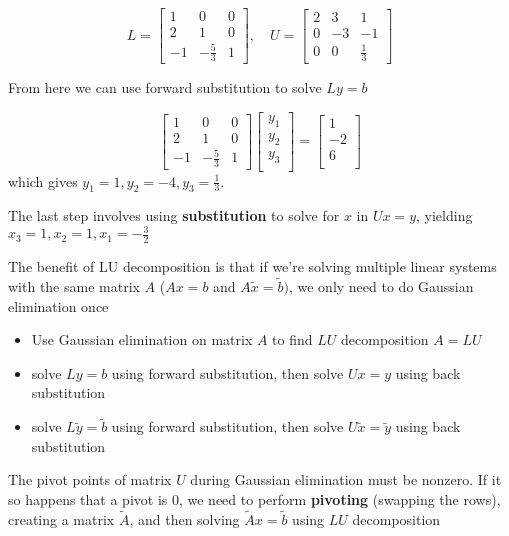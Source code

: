 \documentclass{article}
\begin{document}
\[ L = \begin{bmatrix} 1 & 0 & 0 \\ 2 & 1 & 0 \\ -1 & -\frac{5}{3} & 1 \end{bmatrix}, \quad U = \begin{bmatrix} 2 & 3 & 1 \\ 0 & -3 & -1 \\ 0 & 0 & \frac{1}{3} \end{bmatrix}\]

From here we can use forward substitution to solve $Ly = b$

\[ \left[ \begin{array}{ccc}
    1 & 0 & 0 \\
    2 & 1 & 0 \\
    -1 & -\frac{5}{3} & 1
\end{array} \right]
%
\left[ \begin{array}{c}
    y_1 \\
    y_2 \\
    y_3 \\
\end{array} \right]
 =
\left[ \begin{array}{c}
    1 \\
    -2 \\
    6 \\
\end{array} \right] \]
which gives $y_1 = 1, y_2 = -4, y_3 = \frac{1}{3}$. 

The last step involves using \textbf{substitution} to solve for $x$ in $Ux = y$, yielding $x_3 = 1, x_2 = 1, x_1 = -\frac{3}{2}$

The benefit of LU decomposition is that if we're solving multiple linear systems with the same matrix $A$ ($Ax = b$ and $A\tilde{x} = \tilde{b})$, we only need to do Gaussian elimination once
\begin{itemize}
  \item Use Gaussian elimination on matrix $A$ to find $LU$ decomposition $A= LU$
  \item solve $Ly = b$ using forward substitution, then solve $Ux = y$ using back substitution
  \item solve $L \tilde{y} = \tilde{b}$ using forward substitution, then solve $U\tilde{x} = \tilde{y}$ using back substitution
\end{itemize}

The pivot points of matrix $U$ during Gaussian elimination must be nonzero. If it so happens that a pivot is $0$, we need to perform \textbf{pivoting} (swapping the rows), creating a matrix $\tilde{A}$, and then solving $\tilde{A}x = \tilde{b}$ using $LU$ decomposition
\end{document}
